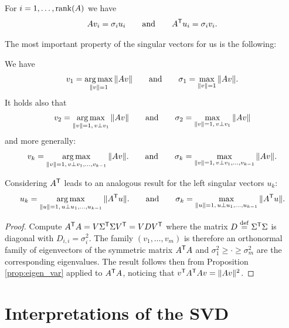 \documentclass[11pt,nocut]{article}
\begin{document}
\begin{proposition}
	For $i=1, \dots, {{\rm rank}}(A)$ we have
	$$
	A v_i = \sigma_i u_i
	\qquad \text{and} \qquad
	A^{{\sf T}} u_i = \sigma_i v_i.
	$$
\end{proposition}

The most important property of the singular vectors for us is the following:
\begin{proposition}\label{prop:max_svd}
	We have
	\begin{equation}
		v_1 = \operatorname*{arg\,max}_{\|v\| = 1} \|A v\| 
		\qquad \text{and} \qquad 
		\sigma_1 = \max_{\|v\| = 1} \|A v\|.
	\end{equation}
	It holds also that
	\begin{equation}
		v_2 = \operatorname*{arg\,max}_{\|v\| = 1, \, v \perp v_1} \| A v \|
		\qquad \text{and} \qquad 
		\sigma_2 = \max_{\|v\| = 1, \, v \perp v_1} \| A v \|
	\end{equation}
	and more generally:
	\begin{equation}
		v_{k}   = \operatorname*{arg\,max}_{\|v\| = 1, \, v \perp v_1, \dots, v_{k-1}} \| A v \|.
		\qquad \text{and} \qquad 
		\sigma_{k} = \max_{\|v\| = 1, \, v \perp v_1, \dots, v_{k-1}} \| A v \|.
	\end{equation}
\end{proposition}
\begin{remark}
	Considering $A^{{\sf T}}$ leads to an analogous result for the left singular vectors $u_k$:
	\begin{equation}
		u_{k}   = \operatorname*{arg\,max}_{\|u\| = 1, \, u \perp u_1, \dots, u_{k-1}} \| A^{{\sf T}} u \|.
		\qquad \text{and} \qquad 
		\sigma_{k} = \max_{\|u\| = 1, \, u \perp u_1, \dots, u_{k-1}} \| A^{{\sf T}} u \|.
	\end{equation}
\end{remark}
\begin{proof}
	Compute $A^{{\sf T}} A = V \Sigma^{{\sf T}} \Sigma V^{{\sf T}} = V D V^{{\sf T}}$ where the matrix $D \overset{\rm def}{=} \Sigma^{{\sf T}} \Sigma$ is diagonal with $D_{i,i} = \sigma_i^2$. The family $(v_1, \dots, v_m)$ is therefore an orthonormal family of eigenvectors of the symmetric matrix $A^{{\sf T}} A$ and $\sigma_1^2 \geq \cdot \geq \sigma_m^2$ are the corresponding eigenvalues. The result follows then from Proposition \ref{prop:eigen_var} applied to $A^{{\sf T}} A$, noticing that $v^{{\sf T}} A^{{\sf T}} A v = \|Av\|^2$.
\end{proof}


\section{Interpretations of the SVD}
\end{document}
